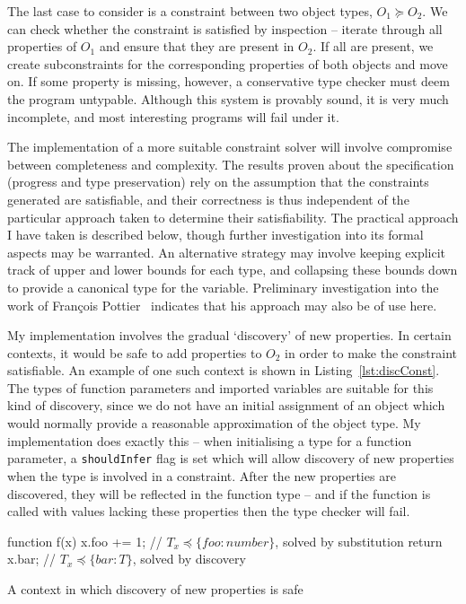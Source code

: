 \documentclass[12pt,a4paper,twoside,openright]{report}
\theoremstyle{definition}
\theoremstyle{dotless}
\newcommand*{\js}{\texttt}
\begin{document}
The last case to consider is a constraint between two object types, $O_1\succeq
O_2$. We can check whether the constraint is satisfied by inspection -- iterate
through all properties of $O_1$ and ensure that they are present in $O_2$. If
all are present, we create subconstraints for the corresponding properties of
both objects and move on.  If some property is missing, however, a conservative
type checker must deem the program untypable. Although this system is provably
sound, it is very much incomplete, and most interesting programs will fail under it.

The implementation of a more suitable constraint solver will involve compromise
between completeness and complexity. The results proven about the specification
(progress and type preservation) rely on the assumption that the constraints
generated are satisfiable, and their correctness is thus independent of the
particular approach taken to determine their satisfiability. The practical
approach I have taken is described below, though further investigation into its
formal aspects may be warranted. An alternative strategy may involve keeping
explicit track of upper and lower bounds for each type, and collapsing these
bounds down to provide a canonical type for the variable. Preliminary
investigation into the work of Fran\c{c}ois Pottier~\cite{pottier1998type}
indicates that his approach may also be of use here.

My implementation involves the gradual `discovery' of new properties.
In certain contexts, it would be safe to add properties to $O_2$ in order to make the
constraint satisfiable. An example of one such context is shown in Listing~\ref{lst:discConst}.
The types of function parameters and imported variables are suitable for this kind of discovery, since 
we do not have an initial assignment of an object which would normally provide a reasonable
approximation of the object type. My implementation does exactly this -- when initialising a type
for a function parameter, a \js{shouldInfer} flag is set which will allow discovery 
of new properties when the type is involved in a constraint. After the new properties are 
discovered, they will be reflected in the function type -- and if the function is called with 
values lacking these properties then the type checker will fail.

\begin{listing}
  \begin{jscript}
	function f(x) {
	  x.foo += 1;   // $T_x \preceq\{foo:number\}$, solved by substitution
	  return x.bar; // $T_x \preceq\{bar:T\}$, solved by discovery
	}
  \end{jscript}
  \caption{A context in which discovery of new properties is safe}
  \label{lst:discConst}
\end{listing}
\end{document}
